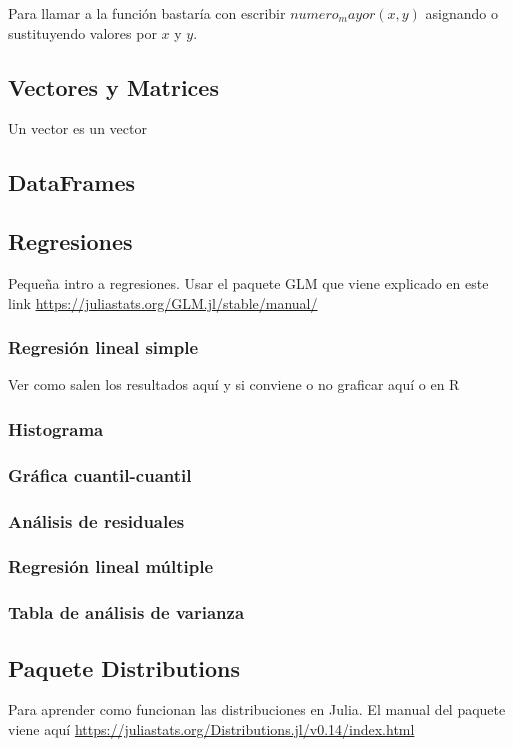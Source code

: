 Para llamar a la función bastaría con escribir $numero_mayor(x, y)$ asignando o sustituyendo valores por $x$ y $y$. 

\subsection{Vectores y Matrices}

\begin{definition}
Un vector es un vector
\end{definition}

\subsection{DataFrames}

\subsection{Regresiones}
Pequeña intro a regresiones. Usar el paquete GLM que viene explicado en este link \url{https://juliastats.org/GLM.jl/stable/manual/}


\subsubsection{Regresión lineal simple}
Ver como salen los resultados aquí y si conviene o no graficar aquí o en R

\subsubsection{Histograma}

\subsubsection{Gráfica cuantil-cuantil}

\subsubsection{Análisis de residuales}

\subsubsection{Regresión lineal múltiple}

\subsubsection{Tabla de análisis de varianza}


\subsection{Paquete Distributions}
Para aprender como funcionan las distribuciones en Julia. El manual del paquete viene aquí \url{https://juliastats.org/Distributions.jl/v0.14/index.html}




